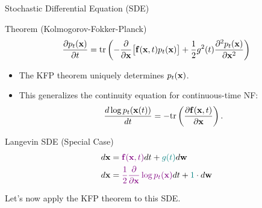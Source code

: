 \documentclass{beamer}
\begin{document}
\begin{frame}{Stochastic Differential Equation (SDE)}
	\begin{block}{Theorem (Kolmogorov-Fokker-Planck)}
		\vspace{-0.2cm}
		\[
			\frac{\partial p_t(\mathbf{x})}{\partial t} = \text{tr}\left( - \frac{\partial}{\partial \mathbf{x}} \bigl[ \mathbf{f}(\mathbf{x}, t) p_t(\mathbf{x})\bigr] + \frac{1}{2} g^2(t) \frac{\partial^2 p_t(\mathbf{x})}{\partial \mathbf{x}^2}\right)
		\]
		\vspace{-0.2cm}
	\end{block}
	\begin{itemize}
		\item The KFP theorem uniquely determines $p_t(\mathbf{x})$.
		\item This generalizes the continuity equation for continuous-time NF:
		\[
			\frac{d \log p_t(\mathbf{x}(t))}{d t} = - \text{tr} \left( \frac{\partial \mathbf{f}(\mathbf{x}, t)}{\partial \mathbf{x}} \right).
		\]
	\end{itemize}
	\eqpause
	\vspace{-0.3cm}
	\begin{block}{Langevin SDE (Special Case)}
		\vspace{-0.6cm}
		\begin{align*}
			d\mathbf{x} &= {\color{violet}\mathbf{f}(\mathbf{x}, t)} dt + {\color{teal}g(t)} d \mathbf{w} \\
			d \mathbf{x} &= {\color{violet}\frac{1}{2} \frac{\partial}{\partial \mathbf{x}} \log p_t(\mathbf{x})} d t + {\color{teal} 1 } \cdot d \mathbf{w}
		\end{align*}
		\vspace{-0.4cm}
	\end{block}
	\eqpause
	Let's now apply the KFP theorem to this SDE.
\end{frame}
\end{document}
